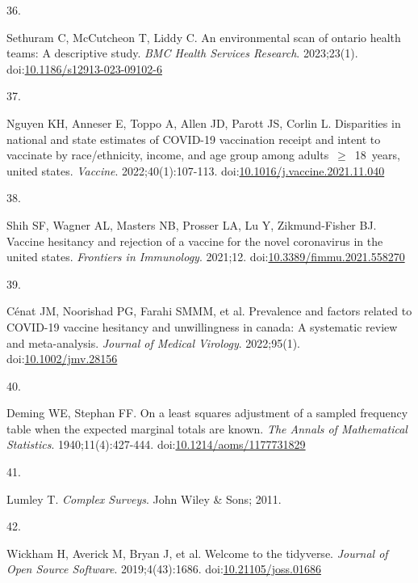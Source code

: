 \documentclass[
  letterpaper,
  DIV=11,
  numbers=noendperiod]{scrartcl}
\newlength{\cslhangindent}
\newlength{\csllabelwidth}
\newlength{\cslentryspacingunit} %
\newenvironment{CSLReferences}[2] %
 {%
  \setlength{\parindent}{0pt}
  \ifodd #1
  \let\oldpar\par
  \def\par{\hangindent=\cslhangindent\oldpar}
  \fi
  \setlength{\parskip}{#2\cslentryspacingunit}
 }%
 {}
\newcommand{\CSLLeftMargin}[1]{\parbox[t]{\csllabelwidth}{#1}}
\newcommand{\CSLRightInline}[1]{\parbox[t]{\linewidth - \csllabelwidth}{#1}\break}
\begin{document}
\begin{CSLReferences}{0}{0}
\leavevmode{}%
\CSLLeftMargin{36. }%
\CSLRightInline{Sethuram C, McCutcheon T, Liddy C. An environmental scan
of ontario health teams: A descriptive study. \emph{{BMC} Health
Services Research}. 2023;23(1).
doi:\href{https://doi.org/10.1186/s12913-023-09102-6}{10.1186/s12913-023-09102-6}}

\leavevmode{}%
\CSLLeftMargin{37. }%
\CSLRightInline{Nguyen KH, Anneser E, Toppo A, Allen JD, Parott JS,
Corlin L. Disparities in national and state estimates of {COVID}-19
vaccination receipt and intent to vaccinate by race/ethnicity, income,
and age group among adults~\(\geq\)~18~years, united states.
\emph{Vaccine}. 2022;40(1):107-113.
doi:\href{https://doi.org/10.1016/j.vaccine.2021.11.040}{10.1016/j.vaccine.2021.11.040}}

\leavevmode{}%
\CSLLeftMargin{38. }%
\CSLRightInline{Shih SF, Wagner AL, Masters NB, Prosser LA, Lu Y,
Zikmund-Fisher BJ. Vaccine hesitancy and rejection of a vaccine for the
novel coronavirus in the united states. \emph{Frontiers in Immunology}.
2021;12.
doi:\href{https://doi.org/10.3389/fimmu.2021.558270}{10.3389/fimmu.2021.558270}}

\leavevmode{}%
\CSLLeftMargin{39. }%
\CSLRightInline{Cénat JM, Noorishad PG, Farahi SMMM, et al. Prevalence
and factors related to {COVID}-19 vaccine hesitancy and unwillingness in
canada: A systematic review and meta-analysis. \emph{Journal of Medical
Virology}. 2022;95(1).
doi:\href{https://doi.org/10.1002/jmv.28156}{10.1002/jmv.28156}}

\leavevmode{}%
\CSLLeftMargin{40. }%
\CSLRightInline{Deming WE, Stephan FF. On a least squares adjustment of
a sampled frequency table when the expected marginal totals are known.
\emph{The Annals of Mathematical Statistics}. 1940;11(4):427-444.
doi:\href{https://doi.org/10.1214/aoms/1177731829}{10.1214/aoms/1177731829}}

\leavevmode{}%
\CSLLeftMargin{41. }%
\CSLRightInline{Lumley T. \emph{Complex Surveys}. John Wiley \& Sons;
2011.}

\leavevmode{}%
\CSLLeftMargin{42. }%
\CSLRightInline{Wickham H, Averick M, Bryan J, et al. Welcome to the
{tidyverse}. \emph{Journal of Open Source Software}. 2019;4(43):1686.
doi:\href{https://doi.org/10.21105/joss.01686}{10.21105/joss.01686}}


\end{CSLReferences}
\end{document}

